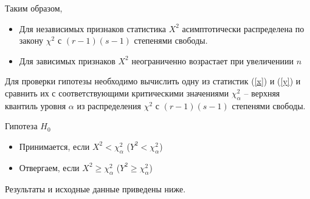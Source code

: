 Таким образом,

\begin{itemize}
	\item Для независимых признаков статистика $X^2$ асимптотически распределена по закону $\chi^2$ с $(r - 1)(s - 1)$ степенями свободы.
	\item Для зависимых признаков $X^2$ неограниченно возрастает при увеличениии $n$
\end{itemize}

Для проверки гипотезы необходимо вычислить одну из статистик (\ref{x}) и (\ref{y}) и сравнить их с соответствующими критическими значениями $\chi^2_{\alpha}$ -- верхняя квантиль уровня $\alpha$ из распределения $\chi^2$ с $(r - 1)(s - 1)$ степенями свободы.

Гипотеза $H_0$
\begin{itemize}
	\item Принимается, если $X^2 < \chi^2_{\alpha}$ ($Y^2 < \chi^2_{\alpha}$)
	\item Отвергаем, если $X^2 \geq \chi^2_{\alpha}$ ($Y^2 \geq \chi^2_{\alpha}$)
\end{itemize}

Результаты и исходные данные приведены ниже.

